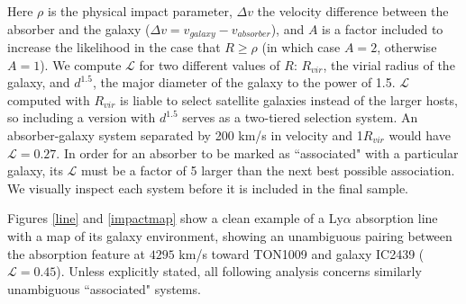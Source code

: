 \documentclass[iop]{emulateapj-rtx4}
\begin{document}
\noindent Here $\rho$ is the physical impact parameter, $\Delta v$ the velocity difference between the absorber and the galaxy ($\Delta v = v_{galaxy} - v_{absorber}$), and $A$ is a factor included to increase the likelihood in the case that $R \geq \rho$ (in which case $A = 2$, otherwise $A = 1$). We compute $\mathcal{L}$ for two different values of $R$: $R_{vir}$, the virial radius of the galaxy, and $d^{1.5}$, the major diameter of the galaxy to the power of 1.5. $\mathcal{L}$ computed with $R_{vir}$ is liable to select satellite galaxies instead of the larger hosts, so including a version with $d^{1.5}$ serves as a two-tiered selection system. An absorber-galaxy system separated by 200 km/s in velocity and 1$R_{vir}$ would have $\mathcal{L} = 0.27$. In order for an absorber to be marked as ``associated" with a particular galaxy, its $\mathcal{L}$ must be a factor of 5 larger than the next best possible association. We visually inspect each system before it is included in the final sample.

Figures \ref{line} and \ref{impactmap} show a clean example of a Ly$\alpha$ absorption line with a map of its galaxy environment, showing an unambiguous pairing between the absorption feature at $4295$ km/s toward TON1009 and galaxy IC2439 ($\mathcal{L} = 0.45$). Unless explicitly stated, all following analysis concerns similarly unambiguous ``associated" systems.



\end{document}
